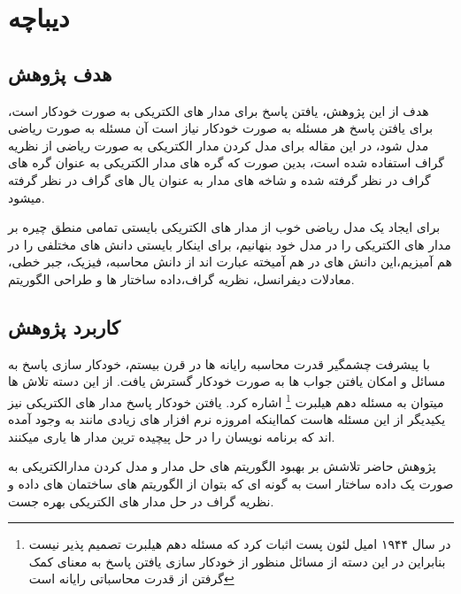 
\chapter{دیباچه}

\section{هدف پژوهش}

هدف از این پژوهش، یافتن پاسخ برای مدار های الکتریکی به صورت خودکار %
است، برای یافتن پاسخ هر مسئله به صورت خودکار نیاز است آن مسئله به صورت ریاضی مدل شود، در این مقاله برای مدل 
کردن مدار الکتریکی به صورت ریاضی از نظریه گراف
استفاده شده است، بدین صورت که گره های مدار الکتریکی به عنوان گره های گراف در نظر گرفته شده و شاخه های مدار به عنوان یال های گراف در نظر گرفته میشود.
 
برای ایجاد یک مدل ریاضی
خوب از مدار های الکتریکی بایستی تمامی منطق چیره بر مدار های الکتریکی را در مدل خود بنهانیم، برای اینکار بایستی دانش های مختلفی را در هم آمیزیم،این دانش های در هم آمیخته
عبارت اند از
دانش محاسبه،
 فیزیک،
  جبر خطی،
   معادلات دیفرانسل،
     نظریه گراف،داده ساختار ها
      و طراحی الگوریتم.
\section{کاربرد پژوهش}
با پیشرفت چشمگیر قدرت محاسبه رایانه ها در قرن بیستم،
خودکار سازی پاسخ به مسائل و امکان یافتن جواب ها به صورت خودکار گسترش یافت.
از این دسته تلاش ها میتوان به مسئله دهم هیلبرت 
\footnote{	  در سال ۱۹۴۴ امیل لئون پست اثبات کرد که مسئله دهم هیلبرت تصمیم پذیر نیست بنابراین در این دسته از مسائل منظور از خودکار سازی یافتن پاسخ به معنای کمک گرفتن از قدرت محاسباتی رایانه است 	}  
اشاره کرد. یافتن خودکار پاسخ مدار های الکتریکی نیز یکیدیگر از این مسئله هاست کمااینکه امروزه نرم افزار
های زیادی مانند
 به وجود آمده اند که برنامه نویسان را در حل پیچیده ترین مدار ها یاری میکنند.
 
 پژوهش حاضر تلاشش بر بهبود الگوریتم های حل مدار و مدل کردن مدارالکتریکی به صورت یک داده ساختار است
 به گونه ای که بتوان از الگوریتم های ساختمان های داده و نظریه گراف در حل مدار های الکتریکی بهره جست.
 
